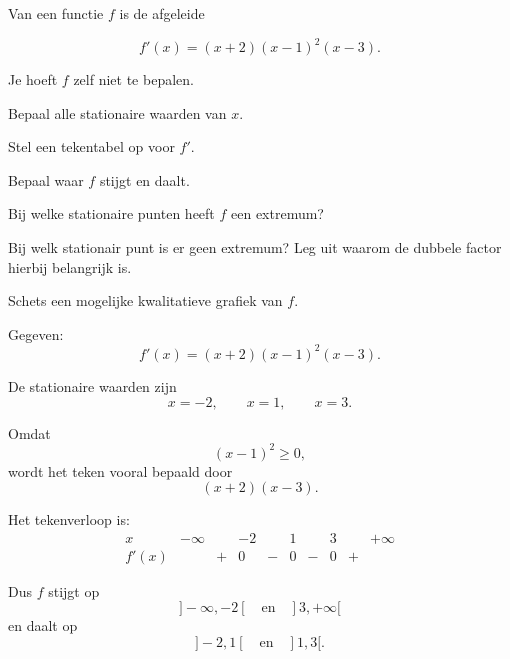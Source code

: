 \documentclass{ximera}
\begin{document}

\begin{oefening}{\oefG}

Van een functie $f$ is de afgeleide

\[
f'(x)=(x+2)(x-1)^2(x-3).
\]

Je hoeft $f$ zelf niet te bepalen.

\begin{question}
Bepaal alle stationaire waarden van $x$.
\end{question}

\begin{question}
Stel een tekentabel op voor $f'$.
\end{question}

\begin{question}
Bepaal waar $f$ stijgt en daalt.
\end{question}

\begin{question}
Bij welke stationaire punten heeft $f$ een extremum?
\end{question}

\begin{question}
Bij welk stationair punt is er geen extremum?
Leg uit waarom de dubbele factor hierbij belangrijk is.
\end{question}

\begin{question}
Schets een mogelijke kwalitatieve grafiek van $f$.
\end{question}

\begin{oplossing}

Gegeven:
\[
f'(x)=(x+2)(x-1)^2(x-3).
\]

De stationaire waarden zijn
\[
\boxed{x=-2,\qquad x=1,\qquad x=3}.
\]

Omdat
\[
(x-1)^2\geq0,
\]
wordt het teken vooral bepaald door
\[
(x+2)(x-3).
\]

Het tekenverloop is:
\[
\begin{array}{c|ccccccccc}
x & -\infty & & -2 & & 1 & & 3 & & +\infty\\ \hline
f'(x) & & + & 0 & - & 0 & - & 0 & + &
\end{array}
\]

Dus $f$ stijgt op
\[
]-\infty,-2[
\quad\text{en}\quad
]3,+\infty[
\]
en daalt op
\[
]-2,1[
\quad\text{en}\quad
]1,3[.
\]


\end{oplossing}
\end{oefening}
\end{document}
